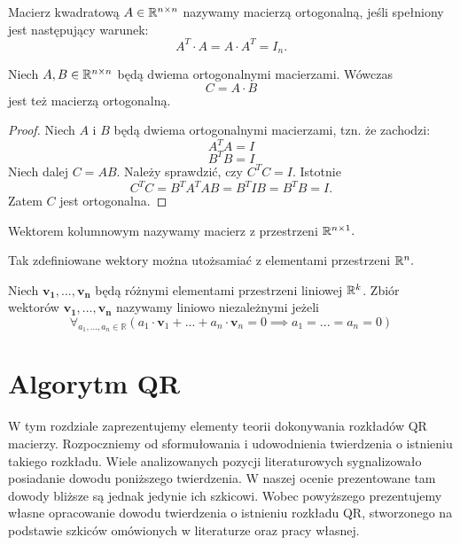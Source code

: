 \documentclass[12pt,a4paper]{report}
\newcommand{\vr}[1]{\mathbf{#1}}
\newcommand{\mx}[1]{{#1}}
\begin{document}
\begin{definition}
Macierz kwadratową $\mx{A}\in \setR^{n\times n}$ nazywamy macierzą ortogonalną, jeśli spełniony jest następujący warunek:
$$
\mx{A}^{T}\cdot \mx{A}=\mx{A}\cdot \mx{A}^{T}=\mx{I}_{n}.
$$
\end{definition}

\begin{lemma}
Niech $\mx{A},\mx{B} \in \setR^{n \times n }$ będą dwiema ortogonalnymi macierzami. Wówczas 
$$
\mx{C}=\mx{A}\cdot \mx{B}
$$
jest też macierzą ortogonalną. 
\end{lemma}

\begin{proof}
Niech $\mx{A}$ i $\mx{B}$ będą dwiema ortogonalnymi macierzami, tzn. że zachodzi:
$$
\mx{A}^{T}\mx{A} = \mx{I}
$$
$$
\mx{B}^{T}\mx{B} = \mx{I}
$$
Niech dalej $\mx{C}=\mx{A}\mx{B}$. Należy sprawdzić, czy $\mx{C}^{T}\mx{C}=\mx{I}$. Istotnie
$$
\mx{C}^{T}\mx{C} = \mx{B}^{T}\mx{A}^{T}\mx{A}\mx{B} = \mx{B}^{T}\mx{I}\mx{B} = \mx{B}^{T}\mx{B} = \mx{I}.
$$
Zatem $\mx{C}$ jest ortogonalna.
\end{proof}

\begin{definition}
Wektorem kolumnowym nazywamy macierz z przestrzeni $\mathbb{R}^{n\times 1}.$
\end{definition}

Tak zdefiniowane wektory można utożsamiać z elementami przestrzeni $\mathbb{R}^{n}.$

\begin{definition}
Niech $\vr{v_{1}},..., \vr{v_{n}}$ będą różnymi elementami przestrzeni liniowej $\mathbb{R}^{k}$. Zbiór wektorów ${\vr{v_{1}},...,\vr{v_{n}}}$ nazywamy liniowo niezależnymi jeżeli 
$$
\forall_{a_{1},...,a_{n}\in \mathbb{R}} (a_{1}\cdot \vr{v}_{1} + ... + a_{n}\cdot \vr{v}_{n} = 0 \implies a_{1}=...=a_{n}=0)
$$ 
\end{definition}


\chapter{Algorytm QR}

W tym rozdziale zaprezentujemy elementy teorii dokonywania rozkładów QR macierzy. Rozpoczniemy od sformułowania i udowodnienia twierdzenia o istnieniu takiego rozkładu. Wiele analizowanych pozycji literaturowych sygnalizowało posiadanie dowodu poniższego twierdzenia. W naszej ocenie prezentowane tam dowody bliższe są jednak jedynie ich szkicowi. Wobec powyższego prezentujemy własne opracowanie dowodu twierdzenia o istnieniu rozkładu QR, stworzonego na podstawie szkiców omówionych w literaturze oraz pracy własnej. 
\end{document}
